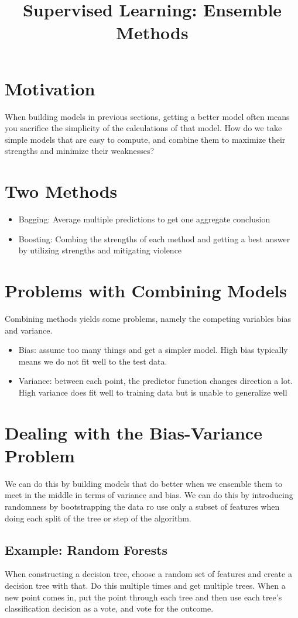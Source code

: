 \documentclass{article}
\title{Supervised Learning: Ensemble Methods}
\begin{document}
\maketitle
\section{Motivation}
When building models in previous sections, getting a better model often means you sacrifice the simplicity of the calculations of that model. How do we take simple models that are easy to compute, and combine them to maximize their strengths and minimize their weaknesses?

\section{Two Methods}
\begin{itemize}
	\item Bagging: Average multiple predictions to get one aggregate conclusion
	\item Boosting: Combing  the strengths of each method and getting a best answer by utilizing strengths and mitigating violence 
\end{itemize}

\section{Problems with Combining Models}
Combining methods yields some problems, namely the competing variables bias and variance.
\begin{itemize}
	\item Bias: assume too many things and get a simpler model. High bias typically means we do not fit well to the test data.
	\item Variance: between each point, the predictor function changes direction a lot. High variance does fit well to training data but is unable to generalize well
\end{itemize}

\section{Dealing with the Bias-Variance Problem}
We can do this by building models that do better when we ensemble them to meet in the middle in terms of variance and bias. We can do this by introducing randomness by bootstrapping the data ro use only a subset of features when doing each split of the tree or step of the algorithm.
\subsection{Example: Random Forests}
When constructing a decision tree, choose a random set of features and create a decision tree with that. Do this multiple times and get multiple trees. When a new point comes in, put the point through each tree and then use each tree's classification decision as a vote, and vote for the outcome. 
\end{document}
